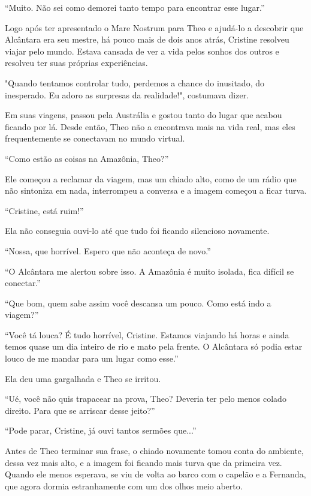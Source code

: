 ``Muito. Não sei como demorei tanto tempo para encontrar esse lugar.''

Logo após ter apresentado o Mare Nostrum para Theo e ajudá-lo a
descobrir que Alcântara era seu mestre, há pouco mais de dois anos
atrás, Cristine resolveu viajar pelo mundo. Estava cansada de ver a vida
pelos sonhos dos outros e resolveu ter suas próprias experiências.

"Quando tentamos controlar tudo, perdemos a chance do inusitado, do
inesperado. Eu adoro as surpresas da realidade!", costumava dizer.

Em suas viagens, passou pela Austrália e gostou tanto do lugar que
acabou ficando por lá. Desde então, Theo não a encontrava mais na vida
real, mas eles frequentemente se conectavam no mundo virtual.

``Como estão as coisas na Amazônia, Theo?''

Ele começou a reclamar da viagem, mas um chiado alto, como de um rádio
que não sintoniza em nada, interrompeu a conversa e a imagem começou a
ficar turva.

``Cristine, está ruim!''

Ela não conseguia ouvi-lo até que tudo foi ficando silencioso novamente.

``Nossa, que horrível. Espero que não aconteça de novo.''

``O Alcântara me alertou sobre isso. A Amazônia é muito isolada, fica
difícil se conectar.''

``Que bom, quem sabe assim você descansa um pouco. Como está indo a
viagem?''

``Você tá louca? É tudo horrível, Cristine. Estamos viajando há horas e
ainda temos quase um dia inteiro de rio e mato pela frente. O Alcântara
só podia estar louco de me mandar para um lugar como esse.''

Ela deu uma gargalhada e Theo se irritou.

``Ué, você não quis trapacear na prova, Theo? Deveria ter pelo menos
colado direito. Para que se arriscar desse jeito?''

``Pode parar, Cristine, já ouvi tantos sermões que...''

Antes de Theo terminar sua frase, o chiado novamente tomou conta do
ambiente, dessa vez mais alto, e a imagem foi ficando mais turva que da
primeira vez. Quando ele menos esperava, se viu de volta ao barco com o
capelão e a Fernanda, que agora dormia estranhamente com um dos olhos
meio aberto.

\asterisc

